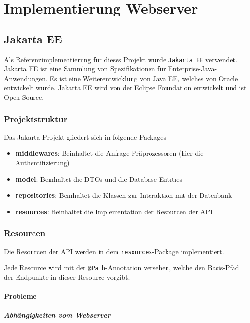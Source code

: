 \chapter{Implementierung Webserver}

\section{Jakarta EE}

Als Referenzimplementierung für dieses Projekt wurde \texttt{Jakarta EE} verwendet.
Jakarta EE ist eine Sammlung von Spezifikationen für Enterprise-Java-Anwendungen.
Es ist eine Weiterentwicklung von Java EE, welches von Oracle entwickelt wurde.
Jakarta EE wird von der Eclipse Foundation entwickelt und ist Open Source.



\subsection{Projektstruktur}

Das Jakarta-Projekt gliedert sich in folgende Packages:
\begin{itemize}
    \item \textbf{middlewares}: Beinhaltet die Anfrage-Präprozessoren (hier die Authentifizierung)
    \item \textbf{model}: Beinhaltet die \ac{DTO}s und die Database-Entities.
    \item \textbf{repositories}: Beinhaltet die Klassen zur Interaktion mit der Datenbank
    \item \textbf{resources}: Beinhaltet die Implementation der Resourcen der API
\end{itemize}

\subsection{Resourcen}

Die Resourcen der API werden in dem \texttt{resources}-Package implementiert.

Jede Resource wird mit der \texttt{@Path}-Annotation versehen, welche den Basis-Pfad der Endpunkte in dieser Resource vorgibt.

\subsubsection{Probleme}

\paragraph{Abhängigkeiten vom Webserver}

